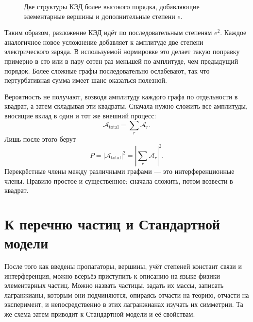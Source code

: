 \begin{figure}[htbp]
\centering
{}
\caption{Две структуры КЭД более высокого порядка, добавляющие элементарные вершины и дополнительные степени \(e\).}
\end{figure}

Таким образом, разложение КЭД идёт по последовательным степеням \(e^2\). Каждое аналогичное новое усложнение добавляет к амплитуде две степени электрического заряда. В используемой нормировке это делает такую поправку примерно в сто или в пару сотен раз меньшей по амплитуде, чем предыдущий порядок. Более сложные графы последовательно ослабевают, так что пертурбативная сумма имеет шанс оказаться полезной.

Вероятность не получают, возводя амплитуду каждого графа по отдельности в квадрат, а затем складывая эти квадраты. Сначала нужно сложить все амплитуды, вносящие вклад в один и тот же внешний процесс:
\begin{equation}
\mathcal{A}_{\mathrm{total}}=\sum_r\mathcal{A}_r.
\end{equation}
Лишь после этого берут
\begin{equation}
P=\left|\mathcal{A}_{\mathrm{total}}\right|^2
=\left|\sum_r\mathcal{A}_r\right|^2.
\end{equation}
Перекрёстные члены между различными графами — это интерференционные члены. Правило простое и существенное: сначала сложить, потом возвести в квадрат.

\section{К перечню частиц и Стандартной модели}

После того как введены пропагаторы, вершины, учёт степеней констант связи и интерференция, можно всерьёз приступить к описанию на языке физики элементарных частиц. Можно назвать частицы, задать их массы, записать лагранжианы, которым они подчиняются, опираясь отчасти на теорию, отчасти на эксперимент, и непосредственно в этих лагранжианах изучать их симметрии. Та же схема затем приводит к Стандартной модели и её свойствам.

